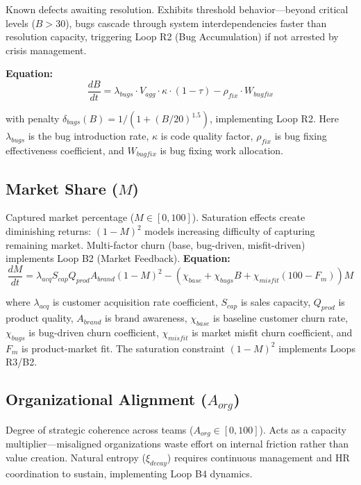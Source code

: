 \documentclass[alpha-refs]{wiley-article}
\begin{document}
Known defects awaiting resolution. Exhibits threshold behavior---beyond critical levels ($B > 30$), bugs cascade through system interdependencies faster than resolution capacity, triggering Loop R2 (Bug Accumulation) if not arrested by crisis management.

\textbf{Equation:}
\begin{equation}
\frac{dB}{dt} = \lambda_{bugs} \cdot V_{agg} \cdot \kappa \cdot (1-\tau) - \rho_{fix} \cdot W_{bugfix}
\end{equation}

\noindent with penalty $\delta_{bugs}(B) = 1/(1+(B/20)^{1.5})$, implementing Loop R2. Here $\lambda_{bugs}$ is the bug introduction rate, $\kappa$ is code quality factor, $\rho_{fix}$ is bug fixing effectiveness coefficient, and $W_{bugfix}$ is bug fixing work allocation.

\subsection{Market Share ($M$)}

Captured market percentage ($M \in [0,100]$). Saturation effects create diminishing returns: $(1 - M)^2$ models increasing difficulty of capturing remaining market. Multi-factor churn (base, bug-driven, misfit-driven) implements Loop B2 (Market Feedback).
\textbf{Equation:}
\begin{equation}
\frac{dM}{dt} = \lambda_{acq} S_{cap} Q_{prod} A_{brand} (1-M)^2 - (\chi_{base} + \chi_{bugs} B + \chi_{misfit}(100-F_m))M
\end{equation}

\noindent where $\lambda_{acq}$ is customer acquisition rate coefficient, $S_{cap}$ is sales capacity, $Q_{prod}$ is product quality, $A_{brand}$ is brand awareness, $\chi_{base}$ is baseline customer churn rate, $\chi_{bugs}$ is bug-driven churn coefficient, $\chi_{misfit}$ is market misfit churn coefficient, and $F_m$ is product-market fit. The saturation constraint $(1-M)^2$ implements Loops R3/B2.

\subsection{Organizational Alignment ($A_{org}$)}

Degree of strategic coherence across teams ($A_{org} \in [0,100]$). Acts as a capacity multiplier---misaligned organizations waste effort on internal friction rather than value creation. Natural entropy ($\xi_{decay}$) requires continuous management and HR coordination to sustain, implementing Loop B4 dynamics.
\end{document}
